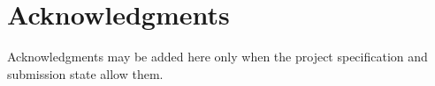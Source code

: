 \section*{Acknowledgments}
Acknowledgments may be added here only when the project specification and submission state allow them.
